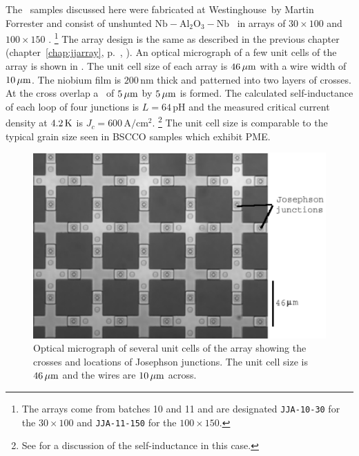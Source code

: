The \jja\ samples discussed here were fabricated at 
Westing\-house\cite{westinghouse}\ by Martin Forrester and consist of
unshunted
$\mathrm{Nb}-\mathrm{Al}_2\mathrm{O}_3-\mathrm{Nb}$ \jjsnoun\
in arrays of $30\times 100$ and $100 \times 150$ \jjsnoun.%
\footnote{The arrays come from batches 10 and 11 and are 
designated \texttt{JJA-10-30} for the $30\times 100$  and \texttt{JJA-11-150}
for the $100 \times 150$.} 
The array design is the same as described in the previous chapter 
(chapter~\ref{chap:jjarray}, p.~\pageref{sec:single_loop},
).
An optical micrograph of a few unit cells of the array is shown
in
. 
The unit cell
size of each array is $46\,\micron$ with a wire width of $10\,\micron$. 
The niobium film is $200\,\mathrm{nm}$ 
thick and patterned into two layers of 
crosses. At the cross overlap a \jjnoun\ of $5\,\micron$ by
$5\,\micron$
is formed.  The calculated self-inductance of each loop of four junctions
is $L=64\,\mathrm{pH}$ and the measured critical current density 
at $4.2\,\kelvin$ is $J_c = 600\,\mathrm{A}/\mathrm{cm}^2$.%
\footnote{See  for a discussion
of the self-inductance in this case.}
The unit cell size is comparable to the typical grain size seen in BSCCO 
samples \cite{braunisch_prl_68_1908_1992,braunisch_prb_48_4030_1993,%
kirtley_jpcm_10_L97_1998} which exhibit PME. 

%
%
\begin{figure}[p]
\includegraphics{figs/pme_exp/fig3_1.ps}
\caption[Optical micrograph of \jja\ samples used in the PME experiment.]
{Optical micrograph of several unit cells of the array showing
the crosses and locations of Josephson junctions. The unit cell size
is $46\,\micron$ and the wires are $10\,\micron$ across.
}
\label{fig:sample_sketch}
\end{figure}


